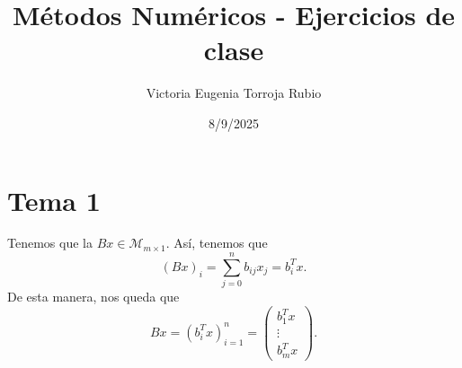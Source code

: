 \documentclass{article}
\begin{document}
\title{Métodos Numéricos - Ejercicios de clase}
\author{Victoria Eugenia Torroja Rubio}
\date{8/9/2025}

\maketitle

\section*{Tema 1}

\begin{ej}
Tenemos que la $\displaystyle Bx \in \mathcal{M}_{m \times 1} $. Así, tenemos que
\[\left(Bx\right)_{i} = \sum^{n}_{j = 0} b_{ij}x_{j} = b^{T}_{i}x .\]
De esta manera, nos queda que 
\[Bx = \left(b^{T}_{i}x\right)_{i = 1}^{n} = \begin{pmatrix} b_{1}^{T}x \\ \vdots \\ b^{T}_{m}x \end{pmatrix} .\]
\end{ej}
\begin{ej}

\end{ej}
\end{document}
